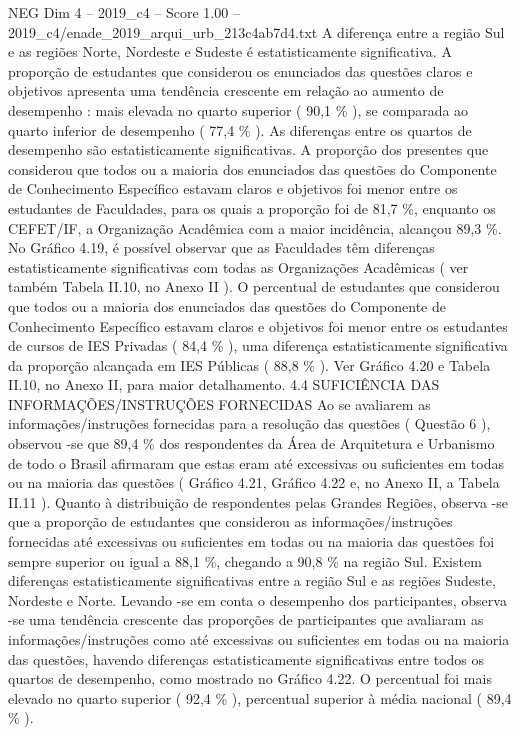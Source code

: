 \begin{textsample}{NEG Dim 4 – 2019\_c4 – Score 1.00 – 2019\_c4/enade\_2019\_arqui\_urb\_213c4ab7d4.txt}
A diferença entre a região Sul e as regiões Norte, Nordeste e Sudeste é estatisticamente significativa.
A proporção de estudantes que considerou os enunciados das questões claros e objetivos apresenta uma tendência crescente em relação ao aumento de desempenho : mais elevada no quarto superior ( 90,1 \% ), se comparada ao quarto inferior de desempenho ( 77,4 \% ).
As diferenças entre os quartos de desempenho são estatisticamente significativas.
A proporção dos presentes que considerou que todos ou a maioria dos enunciados das questões do Componente de Conhecimento Específico estavam claros e objetivos foi menor entre os estudantes de Faculdades, para os quais a proporção foi de 81,7 \%, enquanto os CEFET/IF, a Organização Acadêmica com a maior incidência, alcançou 89,3 \%.
No Gráfico 4.19, é possível observar que as Faculdades têm diferenças estatisticamente significativas com todas as Organizações Acadêmicas ( ver também Tabela II.10, no Anexo II ).
O percentual de estudantes que considerou que todos ou a maioria dos enunciados das questões do Componente de Conhecimento Específico estavam claros e objetivos foi menor entre os estudantes de cursos de IES Privadas ( 84,4 \% ), uma diferença estatisticamente significativa da proporção alcançada em IES Públicas ( 88,8 \% ).
Ver Gráfico 4.20 e Tabela II.10, no Anexo II, para maior detalhamento. 4.4 SUFICIÊNCIA DAS INFORMAÇÕES/INSTRUÇÕES FORNECIDAS Ao se avaliarem as informações/instruções fornecidas para a resolução das questões ( Questão 6 ), observou -se que 89,4 \% dos respondentes da Área de Arquitetura e Urbanismo de todo o Brasil afirmaram que estas eram até excessivas ou suficientes em todas ou na maioria das questões ( Gráfico 4.21, Gráfico 4.22 e, no Anexo II, a Tabela II.11 ).
Quanto à distribuição de respondentes pelas Grandes Regiões, observa -se que a proporção de estudantes que considerou as informações/instruções fornecidas até excessivas ou suficientes em todas ou na maioria das questões foi sempre superior ou igual a 88,1 \%, chegando a 90,8 \% na região Sul.
Existem diferenças estatisticamente significativas entre a região Sul e as regiões Sudeste, Nordeste e Norte.
Levando -se em conta o desempenho dos participantes, observa -se uma tendência crescente das proporções de participantes que avaliaram as informações/instruções como até excessivas ou suficientes em todas ou na maioria das questões, havendo diferenças estatisticamente significativas entre todos os quartos de desempenho, como mostrado no Gráfico 4.22.
O percentual foi mais elevado no quarto superior ( 92,4 \% ), percentual superior à média nacional ( 89,4 \% ).

\end{textsample}
